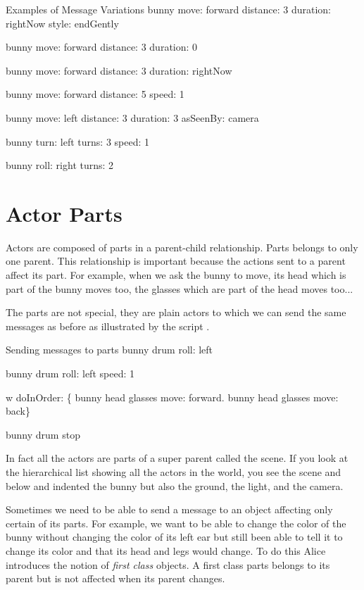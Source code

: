 \begin{scriptwithtitle}{Examples of Message Variations}
bunny move: forward distance: 3 duration: rightNow style: endGently

bunny move: forward distance: 3 duration: 0

bunny move: forward distance: 3 duration: rightNow

bunny move: forward distance: 5 speed: 1

bunny move: left distance: 3 duration: 3 asSeenBy: camera

bunny turn: left turns: 3 speed: 1

bunny roll: right turns: 2
\end{scriptwithtitle}

\section{Actor Parts}
Actors are composed of parts in a parent-child relationship. Parts belongs to only one parent. This relationship is important because the actions sent to a parent affect its part. For example, when we ask 
the bunny to move, its head which is part of the bunny moves too, the glasses which are part of the head moves too...


The parts are not special, they are plain actors to which we can send the same messages as before as illustrated by the script . 

\begin{scriptwithtitle}{Sending messages to parts}\label{scr:parts}
bunny drum roll: left

bunny drum roll: left speed: 1

w doInOrder: \{
bunny head glasses move: forward.
bunny head glasses move: back\}

bunny drum stop
\end{scriptwithtitle}

In fact all the actors are parts of a super parent called the scene. If you look at the hierarchical list
showing all the actors in the world, you see the scene and below and indented the bunny but also the ground, the light, and the camera. 

Sometimes we need to be able to send a message to an object affecting only certain of its parts. For example, 
we want to be able to change the color of the bunny without changing the color of its left ear but still been able to tell it to change its color and that its head and legs would change. To do this Alice introduces the notion of \textit{first class} objects. A first class parts belongs to its parent but is not affected when its parent changes. 

